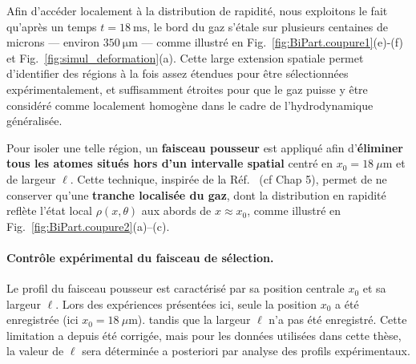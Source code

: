 Afin d’accéder localement à la distribution de rapidité, nous exploitons le fait qu’après un temps $t = 18~\mathrm{ms}$, le bord du gaz s’étale sur plusieurs centaines de microns — environ $350~\mathrm{\mu m}$ — comme illustré en Fig.~\ref{fig:BiPart.coupure1}(e)-(f) et Fig.~\ref{fig:simul_deformation}(a). Cette large extension spatiale permet d’identifier des régions à la fois assez étendues pour être sélectionnées expérimentalement, et suffisamment étroites pour que le gaz puisse y être considéré comme localement homogène dans le cadre de l’hydrodynamique généralisée.

\medskip
\noindent
Pour isoler une telle région, un {\bf faisceau pousseur} est appliqué afin d’{\bf éliminer tous les atomes situés hors d’un intervalle spatial} centré en $x_0 = 18~\mu\mathrm{m}$ et de largeur $\ell$. Cette technique, inspirée de la Réf.~\cite{dubois_probing_2024} (cf Chap 5), permet de ne conserver qu’une {\bf tranche localisée du gaz}, dont la distribution en rapidité reflète l’état local $\rho(x,\theta)$ aux abords de $x \approx x_0$, comme illustré en Fig.~\ref{fig:BiPart.coupure2}(a)--(c).


\medskip
\paragraph{Contrôle expérimental du faisceau de sélection.}

Le profil du faisceau pousseur est caractérisé par sa position centrale $x_0$ et sa largeur $\ell$. Lors des expériences présentées ici, seule la position $x_0$ a été enregistrée (ici $x_0 = 18~\mu\mathrm{m}$). tandis que la largeur $\ell$ n’a pas été enregistré. Cette limitation  a depuis été corrigée, mais pour les données utilisées dans cette thèse, la valeur de $\ell$ sera déterminée a posteriori par analyse des profils expérimentaux.



